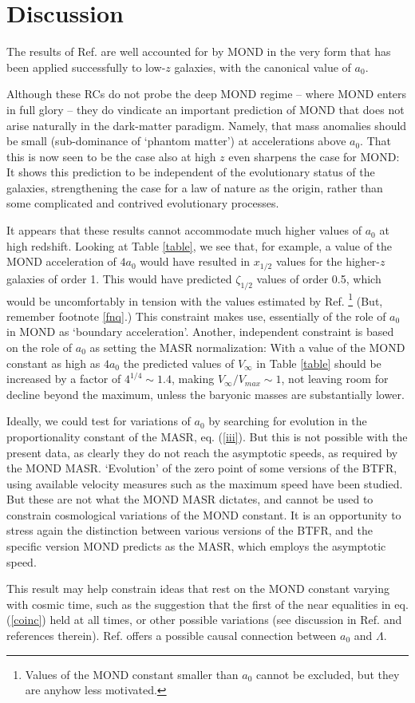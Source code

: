 \documentclass[twocolumn,showpacs,amsmath,amssymb,prd,nofootinbib]
{revtex4}
\def\sss{\scriptscriptstyle}
\def\_#1{_{\sss #1}}
\def\az{a\_{0}}
\def\vinf{V_{\infty}}
\def\zef{\zeta\_{1/2}}
\begin{document}
\section{Discussion}
\label{discussion}
The results of Ref. \cite{genzel17} are well accounted for by MOND in the very form that has been applied successfully to low-$z$ galaxies, with the canonical value of $\az$.
\par
Although these RCs do not probe the deep MOND regime -- where MOND enters in full glory -- they do vindicate an important prediction of MOND that does not arise naturally in the dark-matter paradigm. Namely, that mass anomalies should be small (sub-dominance of `phantom matter') at accelerations above $\az$.
That this is now seen to be the case also at high $z$ even sharpens the case for MOND: It shows this prediction to be independent of the evolutionary status of the galaxies, strengthening the case for a law of nature as the origin, rather than some complicated and contrived evolutionary processes.
\par
It appears that these results cannot accommodate much higher values of $\az$ at high redshift. Looking at Table \ref{table}, we see that, for example, a value of the MOND acceleration of $4\az$ would have resulted in $x\_{1/2}$ values for the higher-$z$ galaxies of order 1. This would have predicted $\zef$ values of order 0.5, which would be uncomfortably in tension with the values estimated by Ref. \cite{genzel17}\footnote{Values of the MOND constant smaller than $\az$ cannot be excluded, but they are anyhow less motivated.} (But, remember footnote \ref{fnq}.) This constraint makes use, essentially of the role of $\az$ in MOND as `boundary acceleration'. Another, independent constraint is based on the role of $\az$ as setting the MASR normalization: With a value of the MOND constant as high as $4\az$ the predicted values of $\vinf$ in  Table \ref{table} should be increased by a factor of $4^{1/4}\sim 1.4$, making $\vinf/V_{max}\sim 1$, not leaving room for decline beyond the maximum, unless the baryonic masses are substantially lower.
\par
Ideally, we could test for variations of $\az$ by searching for evolution in the proportionality constant of the MASR, eq. (\ref{iii}). But this is not possible with the present data, as clearly they do not reach the asymptotic speeds, as required by the MOND MASR.  `Evolution' of the zero point of some versions of the BTFR, using available velocity measures such as the maximum speed have been studied. But these are not what the MOND MASR dictates, and cannot be used to constrain cosmological variations of the MOND constant.
It is an opportunity to stress again the distinction between various versions of the BTFR, and the specific version MOND predicts as the MASR, which employs the asymptotic speed.
\par
This result may help constrain ideas that rest on the MOND constant varying with cosmic time, such as the suggestion that the first of the near equalities in eq. (\ref{coinc}) held at all times, or other possible variations (see discussion in Ref. \cite{milgrom09} and references therein). Ref. \cite{milgrom99} offers a possible causal connection between $\az$ and $\Lambda$.
\end{document}
